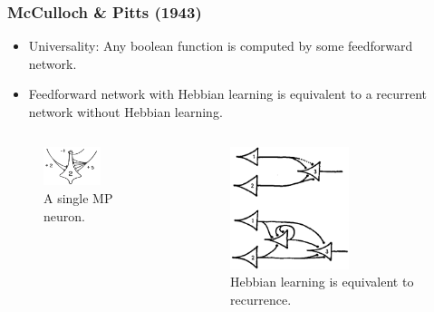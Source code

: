 \documentclass{beamer}
\begin{document}
\begin{frame}
\frametitle{McCulloch \& Pitts (1943)}
\begin{itemize}
    \item Universality: Any boolean function is computed by some feedforward network.
    \item Feedforward network with Hebbian learning is equivalent to a recurrent network without Hebbian learning.
\end{itemize}

\begin{columns}
\begin{column}{0.5\textwidth}
\begin{figure}[t]
    \includegraphics[width=0.6\textwidth]{figure/MP_neuron.png}
    \centering
    \caption{A single MP neuron.}
\end{figure}
\end{column}
\begin{column}{0.5\textwidth}
    \begin{figure}[t]
        \includegraphics[width=0.6\textwidth]{figure/MP_recurrent_learning.png}
        \centering
        \caption{Hebbian learning is equivalent to recurrence.}
    \end{figure}        
\end{column}
\end{columns}

\end{frame}
\end{document}
